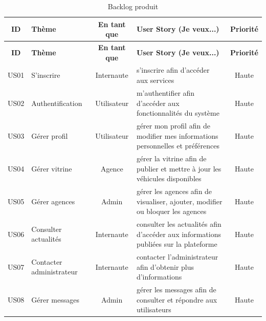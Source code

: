 \begin{longtable}{|c|l|c|p{4cm}|c|}
\caption{Backlog produit}
\label{tab:backlogproduit} \\

\hline
\textbf{ID} & \textbf{Thème} & \textbf{En tant que} & \textbf{User Story (Je veux...)} & \textbf{Priorité} \\
\hline
\endfirsthead

\hline
\textbf{ID} & \textbf{Thème} & \textbf{En tant que} & \textbf{User Story (Je veux...)} & \textbf{Priorité} \\
\hline
\endhead

\hline
\endfoot

\hline
\endlastfoot

US01 & S'inscrire & Internaute & s'inscrire afin d'accéder aux services & Haute \\ \hline
US02 & Authentification & Utilisateur & m'authentifier afin d'accéder aux fonctionnalités du système & Haute \\ \hline
US03 & Gérer profil & Utilisateur & gérer mon profil afin de modifier mes informations personnelles et préférences & Haute \\ \hline
US04 & Gérer vitrine & Agence & gérer la vitrine afin de publier et mettre à jour les véhicules disponibles & Haute \\ \hline
US05 & Gérer agences & Admin & gérer les agences afin de visualiser, ajouter, modifier ou bloquer les agences & Haute \\ \hline

US06 & Consulter actualités & Internaute & consulter les actualités afin d'accéder aux informations publiées sur la plateforme & Haute \\ \hline
US07 & Contacter administrateur & Internaute & contacter l'administrateur afin d'obtenir plus d'informations & Haute \\ \hline
US08 & Gérer messages & Admin & gérer les messages afin de consulter et répondre aux utilisateurs & Haute \\ \hline


\end{longtable}
